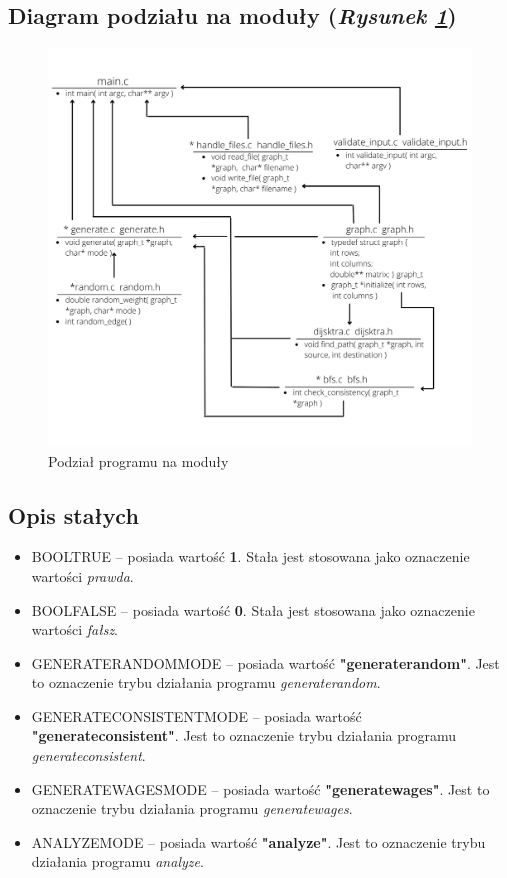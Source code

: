 \documentclass{article}
\begin{document}
\subsection{Diagram podziału na moduły (\emph{Rysunek \ref{fig:modulo}})}
\begin{figure}[htp]
        \centering
        \includegraphics[width=14cm]{images/modulo.png}
        \caption{Podział programu na moduły}
        \label{fig:modulo}
\end{figure}

\newpage

\subsection{Opis stałych}
\begin{itemize}
    \item BOOL\textunderscore TRUE -- posiada wartość \textbf{1}. Stała jest stosowana jako oznaczenie wartości \emph{prawda}.
    \item BOOL\textunderscore FALSE -- posiada wartość \textbf{0}. Stała jest stosowana jako oznaczenie wartości \emph{fałsz}.
    \item GENERATE\textunderscore RANDOM\textunderscore MODE -- posiada wartość \textbf{"generate\textunderscore random"}. Jest to oznaczenie trybu działania programu \emph{generate\textunderscore random}.
    \item GENERATE\textunderscore CONSISTENT\textunderscore MODE -- posiada wartość \textbf{"generate\textunderscore consistent"}. Jest to oznaczenie trybu działania programu \emph{generate\textunderscore consistent}.
    \item GENERATE\textunderscore WAGES\textunderscore MODE -- posiada wartość \textbf{"generate\textunderscore wages"}. Jest to oznaczenie trybu działania programu \emph{generate\textunderscore wages}.
    \item ANALYZE\textunderscore MODE -- posiada wartość \textbf{"analyze"}. Jest to oznaczenie trybu działania programu \emph{analyze}.
\end{itemize}
\end{document}
